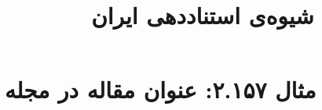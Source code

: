 \documentclass[a4paper,10pt]{article}
\begin{document}
\title{شیوه‌ی استناددهی ایران
 }
\author{}
\date{}
\maketitle



\section*{مثال ۲.۱۵۷: عنوان مقاله در مجله}

\cite{حری1383}\\
\cite{terborgh1974}\\






\end{document}
